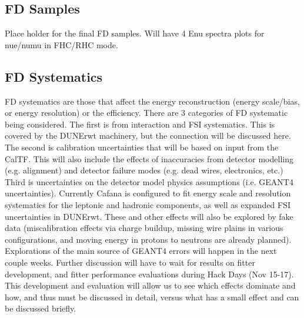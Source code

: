 \subsection{FD Samples}

Place holder for the final FD samples. Will have 4 Enu spectra plots for nue/numu in FHC/RHC mode.

\subsection{FD Systematics}
FD systematics are those that affect the energy reconstruction (energy scale/bias, or energy resolution) or the efficiency. There are 3 categories of FD systematic being considered. The first is from interaction and FSI systematics. This is covered by the DUNErwt machinery, but the connection will be discussed here. The second is calibration uncertainties that will be based on input from the CalTF. This will also include the effects of inaccuracies from detector modelling (e.g. alignment) and detector failure modes (e.g. dead wires, electronics, etc.) Third is uncertainties on the detector model physics assumptions (i.e. GEANT4 uncertainties).  Currently Cafana is configured to fit energy scale and resolution systematics for the leptonic and hadronic components, as well as expanded FSI uncertainties in DUNErwt. These and other effects will also be explored by fake data (miscalibration effects via charge buildup, missing wire plains in various configurations, and moving energy in protons to neutrons are already planned). Explorations of the main source of GEANT4 errors will happen in the next couple weeks. Further discussion will have to wait for results on fitter development, and fitter performance evaluations during
Hack Days (Nov 15-17). This development and evaluation will allow us to see which effects dominate and how, and thus must be discussed in detail, versus what has a small effect and can be discussed briefly.





